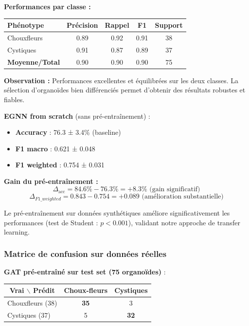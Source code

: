 \textbf{Performances par classe :}
\begin{center}
\begin{tabular}{|l|c|c|c|c|}
\hline
\textbf{Phénotype} & \textbf{Précision} & \textbf{Rappel} & \textbf{F1} & \textbf{Support} \\
\hline
Chouxfleurs & 0.89 & 0.92 & 0.91 & 38 \\
Cystiques & 0.91 & 0.87 & 0.89 & 37 \\
\hline
\textbf{Moyenne/Total} & 0.90 & 0.90 & 0.90 & 75 \\
\hline
\end{tabular}
\end{center}

\textbf{Observation :} Performances excellentes et équilibrées sur les deux classes. La sélection d'organoïdes bien différenciés permet d'obtenir des résultats robustes et fiables.

\textbf{EGNN from scratch} (sans pré-entraînement) :
\begin{itemize}
    \item \textbf{Accuracy} : 76.3 ± 3.4\% (baseline)
    \item \textbf{F1 macro} : 0.621 ± 0.048
    \item \textbf{F1 weighted} : 0.754 ± 0.031
\end{itemize}

\textbf{Gain du pré-entraînement :}
\[
\Delta_{\text{acc}} = 84.6\% - 76.3\% = +8.3\% \text{ (gain significatif)}
\]
\[
\Delta_{F1\_weighted} = 0.843 - 0.754 = +0.089 \text{ (amélioration substantielle)}
\]

Le pré-entraînement sur données synthétiques améliore significativement les performances (test de Student : $p < 0.001$), validant notre approche de transfer learning.

\subsubsection{Matrice de confusion sur données réelles}

\textbf{GAT pré-entraîné sur test set (75 organoïdes)} :

\begin{center}
\begin{tabular}{|l|cc|}
\hline
\multicolumn{1}{|c|}{\textbf{Vrai $\backslash$ Prédit}} & \textbf{Choux-fleurs} & \textbf{Cystiques} \\
\hline
Chouxfleurs (38) & \textbf{35} & 3 \\
Cystiques (37) & 5 & \textbf{32} \\
\hline
\end{tabular}
\end{center}

